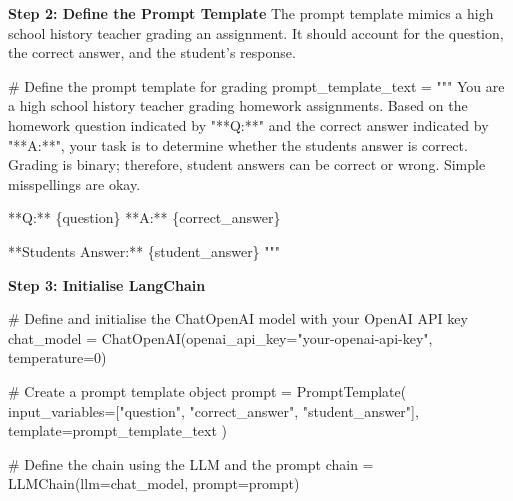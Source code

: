 \documentclass[
]{agujournal2019}
\newenvironment{Shaded}{\begin{snugshade}}{\end{snugshade}}
\newcommand{\CommentTok}[1]{\textcolor[rgb]{0.37,0.37,0.37}{#1}}
\newcommand{\DecValTok}[1]{\textcolor[rgb]{0.68,0.00,0.00}{#1}}
\newcommand{\NormalTok}[1]{\textcolor[rgb]{0.00,0.23,0.31}{#1}}
\newcommand{\OperatorTok}[1]{\textcolor[rgb]{0.37,0.37,0.37}{#1}}
\newcommand{\SpecialCharTok}[1]{\textcolor[rgb]{0.37,0.37,0.37}{#1}}
\newcommand{\StringTok}[1]{\textcolor[rgb]{0.13,0.47,0.30}{#1}}
\begin{document}
\textbf{Step 2: Define the Prompt Template} The prompt template mimics a
high school history teacher grading an assignment. It should account for
the question, the correct answer, and the student's response.

\begin{Shaded}
\begin{Highlighting}[]
\CommentTok{\# Define the prompt template for grading}
\NormalTok{prompt\_template\_text }\OperatorTok{=} \StringTok{"""}
\StringTok{You are a high school history teacher grading homework assignments. }
\StringTok{Based on the homework question indicated by "**Q:**" and the correct answer }
\StringTok{indicated by "**A:**", your task is to determine whether the student\textquotesingle{}s answer is correct. }
\StringTok{Grading is binary; therefore, student answers can be correct or wrong. }
\StringTok{Simple misspellings are okay.}

\StringTok{**Q:** }\SpecialCharTok{\{question\}}
\StringTok{**A:** }\SpecialCharTok{\{correct\_answer\}}

\StringTok{**Student\textquotesingle{}s Answer:** }\SpecialCharTok{\{student\_answer\}}
\StringTok{"""}
\end{Highlighting}
\end{Shaded}

\textbf{Step 3: Initialise LangChain}

\begin{Shaded}
\begin{Highlighting}[]
\CommentTok{\# Define and initialise the ChatOpenAI model with your OpenAI API key}
\NormalTok{chat\_model }\OperatorTok{=}\NormalTok{ ChatOpenAI(openai\_api\_key}\OperatorTok{=}\StringTok{"your{-}openai{-}api{-}key"}\NormalTok{, temperature}\OperatorTok{=}\DecValTok{0}\NormalTok{)}

\CommentTok{\# Create a prompt template object}
\NormalTok{prompt }\OperatorTok{=}\NormalTok{ PromptTemplate(}
\NormalTok{    input\_variables}\OperatorTok{=}\NormalTok{[}\StringTok{"question"}\NormalTok{, }\StringTok{"correct\_answer"}\NormalTok{, }\StringTok{"student\_answer"}\NormalTok{],}
\NormalTok{    template}\OperatorTok{=}\NormalTok{prompt\_template\_text}
\NormalTok{)}

\CommentTok{\# Define the chain using the LLM and the prompt}
\NormalTok{chain }\OperatorTok{=}\NormalTok{ LLMChain(llm}\OperatorTok{=}\NormalTok{chat\_model, prompt}\OperatorTok{=}\NormalTok{prompt)}
\end{Highlighting}
\end{Shaded}
\end{document}
